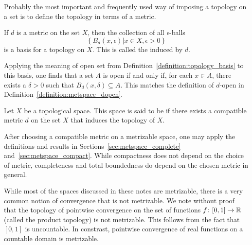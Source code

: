 
Probably the most important and frequently used way of imposing a topology on a set is to define the topology in terms of a metric.
\begin{example}
If $d$ is a metric on the set $X$, then the collection of all $\epsilon$-balls
\begin{equation*}
\left\{ B_d (x, \epsilon) |  x \in X, \epsilon > 0 \right\}
\end{equation*}
is a basis for a topology on $X$.
This is called the  induced by $d$.

Applying the meaning of open set from Definition~\ref{definition:topology_basis} to this basis, one finds that a set $A$ is open if and only if, for each $x \in A$, there exists a $\delta > 0$ such that $B_d(x,\delta)\subseteq A$.
This matches the definition of $d$-open  in Definition~\ref{definition:metspace_dopen}.
\end{example}

\begin{definition}
Let $X$ be a topological space.
This space is said to be  if there exists a compatible metric $d$ on the set $X$ that induces the topology of $X$.
\end{definition}

After choosing a compatible metric on a metrizable space, one may apply the definitions and results in Sections~\ref{sec:metspace_complete} and~\ref{sec:metspace_compact}.
While compactness does not depend on the choice of metric, completeness and total boundedness do depend on the chosen metric in general.

\begin{example}
While most of the spaces discussed in these notes are metrizable, there is a very common notion of convergence that is not metrizable.
We note without proof that  the topology of pointwise convergence on the set of functions $f \colon [0,1]\rightarrow \mathbb{R}$ (called the product topology) is not metrizable.
This follows from the fact that $[0,1]$ is uncountable.
In constrast, pointwise convergence of real functions on a countable domain is metrizable.
\end{example}


